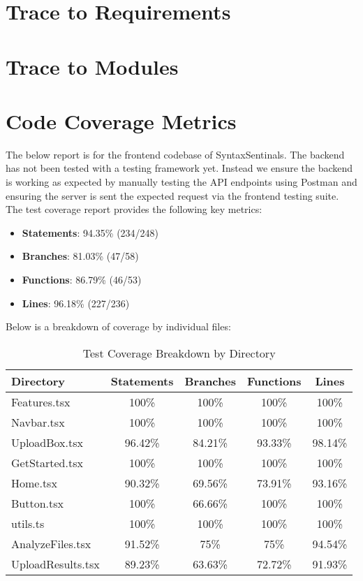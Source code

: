 \documentclass[12pt, titlepage]{article}
\begin{document}
\section{Trace to Requirements}
		
\section{Trace to Modules}		

\section{Code Coverage Metrics}

The below report is for the frontend codebase of SyntaxSentinals. The backend has not been tested with a testing framework yet.
Instead we ensure the backend is working as expected by manually testing the API endpoints using Postman and ensuring the server is sent the 
expected request via the frontend testing suite. \\

The test coverage report provides the following key metrics:

\begin{itemize}
\item \textbf{Statements}: 94.35\% (234/248)
\item \textbf{Branches}: 81.03\% (47/58)
\item \textbf{Functions}: 86.79\% (46/53)
\item \textbf{Lines}: 96.18\% (227/236)
\end{itemize}

\newpage

Below is a breakdown of coverage by individual files:

\begin{table}[h]
    \centering
    \begin{tabular}{|l|c|c|c|c|}
    \hline
    \textbf{Directory} & \textbf{Statements} & \textbf{Branches} & \textbf{Functions} & \textbf{Lines} \\
    \hline
    Features.tsx & 100\% & 100\% & 100\% & 100\% \\
    Navbar.tsx & 100\% & 100\% & 100\% & 100\% \\
    UploadBox.tsx & 96.42\% & 84.21\% & 93.33\% & 98.14\% \\
    GetStarted.tsx & 100\% & 100\% & 100\% & 100\% \\
    Home.tsx & 90.32\% & 69.56\% & 73.91\% & 93.16\% \\
    Button.tsx & 100\% & 66.66\% & 100\% & 100\% \\
    utils.ts & 100\% & 100\% & 100\% & 100\% \\
    AnalyzeFiles.tsx & 91.52\% & 75\% & 75\% & 94.54\% \\
    UploadResults.tsx & 89.23\% & 63.63\% & 72.72\% & 91.93\% \\
    \hline
    \end{tabular}
    \caption{Test Coverage Breakdown by Directory}
    \label{tab:coverage}
\end{table}
\end{document}

